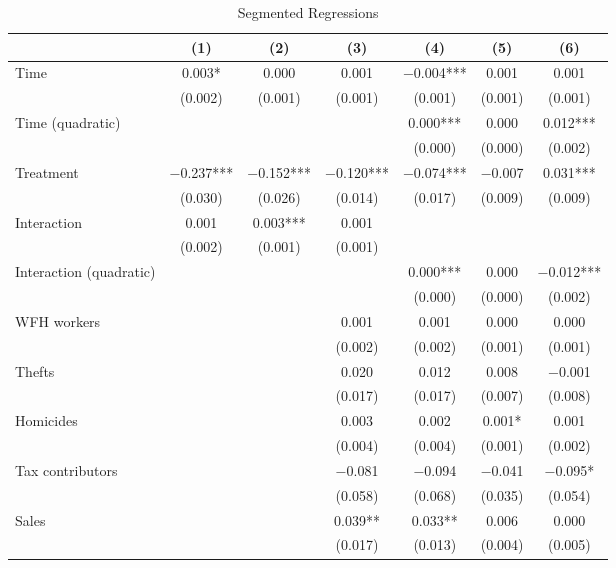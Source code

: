 \documentclass[11pt,a4paper]{article}\usepackage[]{graphicx}\usepackage[]{xcolor}
\begin{document}
\begin{table}[htbp!]
\caption{Segmented Regressions}
\label{tab:regseg}

\begin{tabular}[t]{lcccccc}
\toprule
  & (1) & (2) & (3) & (4) & (5) & (6)\\
\midrule
Time & \num{0.003}* & \num{0.000} & \num{0.001} & \num{-0.004}*** & \num{0.001} & \num{0.001}\\
 & (\num{0.002}) & (\num{0.001}) & (\num{0.001}) & (\num{0.001}) & (\num{0.001}) & (\num{0.001})\\
Time (quadratic) &  &  &  & \num{0.000}*** & \num{0.000} & \num{0.012}***\\
 &  &  &  & (\num{0.000}) & (\num{0.000}) & \vphantom{1} (\num{0.002})\\
Treatment & \num{-0.237}*** & \num{-0.152}*** & \num{-0.120}*** & \num{-0.074}*** & \num{-0.007} & \num{0.031}***\\
 & (\num{0.030}) & (\num{0.026}) & (\num{0.014}) & (\num{0.017}) & (\num{0.009}) & (\num{0.009})\\
Interaction & \num{0.001} & \num{0.003}*** & \num{0.001} &  &  & \\
 & (\num{0.002}) & (\num{0.001}) & (\num{0.001}) &  &  & \\
Interaction (quadratic) &  &  &  & \num{0.000}*** & \num{0.000} & \num{-0.012}***\\
 &  &  &  & (\num{0.000}) & (\num{0.000}) & (\num{0.002})\\
WFH workers &  &  & \num{0.001} & \num{0.001} & \num{0.000} & \num{0.000}\\
 &  &  & (\num{0.002}) & (\num{0.002}) & (\num{0.001}) & (\num{0.001})\\
Thefts &  &  & \num{0.020} & \num{0.012} & \num{0.008} & \num{-0.001}\\
 &  &  & (\num{0.017}) & (\num{0.017}) & (\num{0.007}) & (\num{0.008})\\
Homicides &  &  & \num{0.003} & \num{0.002} & \num{0.001}* & \num{0.001}\\
 &  &  & (\num{0.004}) & (\num{0.004}) & (\num{0.001}) & (\num{0.002})\\
Tax contributors &  &  & \num{-0.081} & \num{-0.094} & \num{-0.041} & \num{-0.095}*\\
 &  &  & (\num{0.058}) & (\num{0.068}) & (\num{0.035}) & (\num{0.054})\\
Sales &  &  & \num{0.039}** & \num{0.033}** & \num{0.006} & \num{0.000}\\
 &  &  & (\num{0.017}) & (\num{0.013}) & (\num{0.004}) & (\num{0.005})\\

\end{tabular}
\end{table}
\end{document}
